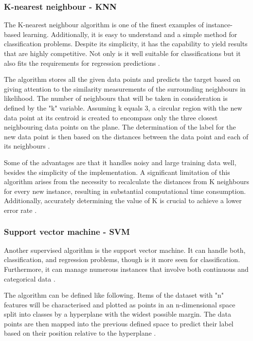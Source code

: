 \subsubsection{K-nearest neighbour - KNN}
The K-nearest neighbour algorithm is one of the finest examples of instance-based learning. Additionally, it is easy to understand and a simple method for classification problems. Despite its simplicity, it has the capability to yield results that are highly competitive. Not only is it well suitable for classifications but it also fits the requirements for regression predictions \citep{sen_supervised_2020}.

The algorithm stores all the given data points and predicts the target based on giving attention to the similarity measurements of the surrounding neighbours in likelihood. The number of neighbours that will be taken in consideration is defined by the "k" variable. Assuming k equals 3, a circular region with the new data point at its centroid is created to encompass only the three closest neighbouring data points on the plane. The determination of the label for the new data point is then based on the distances between the data point and each of its neighbours \citep{sen_supervised_2020}.

Some of the advantages are that it handles noisy and large training data well, besides the simplicity of the implementation. A significant limitation of this algorithm arises from the necessity to recalculate the distances from K neighbours for every new instance, resulting in substantial computational time consumption. Additionally, accurately determining the value of K is crucial to achieve a lower error rate \citep{sen_supervised_2020}.

\subsubsection{Support vector machine - SVM}
Another supervised algorithm is the support vector machine. It can handle both, classification, and regression problems, though is it more seen for classification. Furthermore, it can manage numerous instances that involve both continuous and categorical data \citep{sen_supervised_2020}.

The algorithm can be defined like following. Items of the dataset with "n" features will be characterised and plotted as points in an n-dimensional space split into classes by a hyperplane with the widest possible margin. The data points are then mapped into the previous defined space to predict their label based on their position relative to the hyperplane \citep{sen_supervised_2020}.

